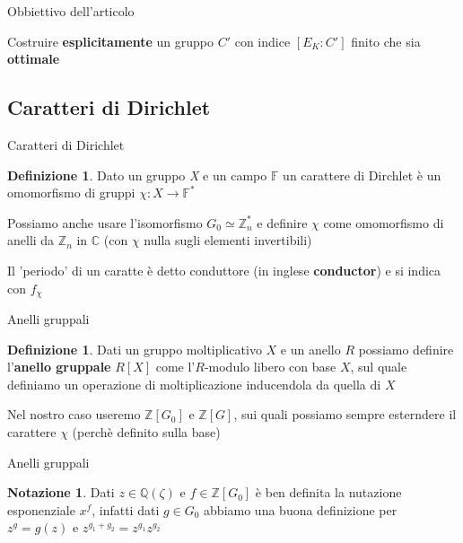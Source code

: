 \documentclass{beamer}
\theoremstyle{plain}
\theoremstyle{remark}
\theoremstyle{definition}
\newtheorem{deff}[teo]{Definizione}
\newtheorem*{nota}{Notazione}
\newcommand{\Z}{\mathbb{Z}}
\newcommand{\F}{\mathbb{F}}
\newcommand{\Q}{\mathbb{Q}}
\newcommand{\C}{\mathbb{C}}
\begin{document}
	\begin{frame}{Obbiettivo dell'articolo}
		\begin{alertblock}{}
			 	Costruire \textbf{esplicitamente} un gruppo  $ C' $ con indice $ [ E_K : C' ] $ finito che sia \textbf{ottimale}
		\end{alertblock}
	\end{frame}
	
	\subsection{Caratteri di Dirichlet}
	
	\begin{frame}{Caratteri di Dirichlet}
		\begin{deff}
			 	Dato un gruppo \textit{X} e un campo $ \F $ un carattere di Dirchlet è un omomorfismo di gruppi $ \chi :X \to \F ^*  $
		 \end{deff}
		 \pause
		 Possiamo anche usare l'isomorfismo $ G_0 \simeq \Z_n ^ *$ e definire $\chi$ come omomorfismo di anelli da $ \Z_n $ in $ \C $ (con $\chi$ nulla sugli elementi invertibili)
		 \pause
		 \begin{exampleblock}{}
		 Il 'periodo' di un caratte è detto conduttore (in inglese \textbf{conductor}) e si indica con $ f_\chi $
		 \end{exampleblock}
	\end{frame}
	
	\begin{frame}{Anelli gruppali}
		\begin{deff}
			Dati un gruppo moltiplicativo $ X $ e un anello $ R $ possiamo definire l'\textbf{anello gruppale} $ R[X] $ come l'$ R $-modulo libero con base $ X $, sul quale definiamo un operazione di moltiplicazione inducendola da quella di $ X $
		\end{deff}
		\pause
		Nel nostro caso useremo $ \Z [G_0] $ e $ \Z [G] $, sui quali possiamo sempre esterndere il carattere $\chi$ (perchè definito sulla base)
	\end{frame}
	
	\begin{frame}{Anelli gruppali}
		\begin{nota}
				Dati $ z \in \Q (\zeta) $ e $ f \in \Z[G_0]  $ è ben definita la nutazione esponenziale $ x^f $, \pause infatti dati $ g\in G_0 $ abbiamo una buona definizione per  $ z^g = g(z) $ e $ z ^{g_1 + g_2}= z^{g_1} z^{g_2} $
		\end{nota}
	\end{frame}
	
\end{document}
